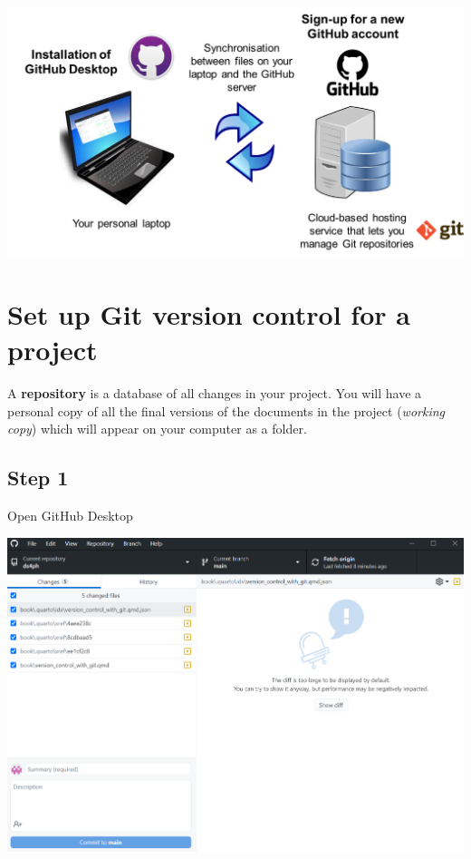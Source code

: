 \documentclass[
  letterpaper,
  DIV=11,
  numbers=noendperiod,
  oneside]{scrreprt}
\begin{document}
\includegraphics{images/paste-081F7F03.png}

\hypertarget{set-up-git-version-control-for-a-project}{%
\section{Set up Git version control for a
project}\label{set-up-git-version-control-for-a-project}}

\begin{tcolorbox}[enhanced jigsaw, coltitle=black, opacityback=0, title=\textcolor{quarto-callout-note-color}{\faInfo}\hspace{0.5em}{Note}, toprule=.15mm, bottomtitle=1mm, colbacktitle=quarto-callout-note-color!10!white, colframe=quarto-callout-note-color-frame, left=2mm, opacitybacktitle=0.6, bottomrule=.15mm, arc=.35mm, toptitle=1mm, colback=white, titlerule=0mm, breakable, leftrule=.75mm, rightrule=.15mm]

A \textbf{repository} is a database of all changes in your project. You
will have a personal copy of all the final versions of the documents in
the project (\emph{working copy}) which will appear on your computer as
a folder.

\end{tcolorbox}

\subsection{Step 1}

Open GitHub Desktop

\includegraphics{images/paste-EFF40D72.png}
\end{document}
